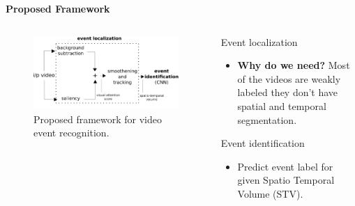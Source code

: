 \begin{frame}{\textbf{Proposed Framework}}
\begin{columns}
	\begin{column}{0.6\textwidth}
	\begin{figure}
	\begin{framed}
		\centering
		\includegraphics[width=\textwidth]{./img/outline.png}
	\end{framed}
		\caption{Proposed framework for video event recognition.}
	\end{figure}
	\end{column}
	\begin{column}{0.3\textwidth}
		\begin{varblock}[\textwidth]{Event localization}
			\begin{itemize}							
				\item \textbf{Why do we need?} Most of the videos are weakly labeled they don't have spatial and temporal segmentation.
			\end{itemize}
		\end{varblock}
		\begin{varblock}[\textwidth]{Event identification}
			\begin{itemize}
				\item Predict event label for given Spatio Temporal Volume (STV).
			\end{itemize}
		\end{varblock}
	\end{column}
\end{columns}	
\end{frame}

